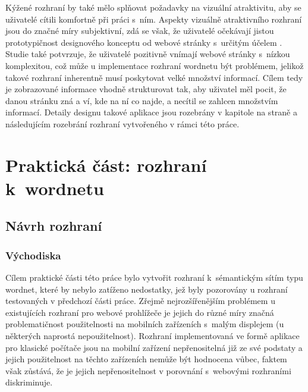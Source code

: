 \documentclass[a4paper, 11pt, oneside, showtrims]{book}
\newcommand{\itNameRef}[1]{\textit{\nameref{#1}}}
\begin{document}
			Kýžené rozhraní by také mělo splňovat požadavky na vizuální atraktivitu, aby se uživatelé cítili komfortně při práci s~ním. Aspekty vizuálně atraktivního rozhraní jsou do značné míry subjektivní, zdá se však, že uživatelé očekávají jistou prototypičnost designového konceptu od webové stránky s~určitým účelem \parencite{walker2013simple, tuch2012role}. Studie \parencite{tuch2012role} také potvrzuje, že uživatelé pozitivně vnímají webové stránky s~nízkou komplexitou, což může u implementace rozhraní wordnetu být problémem, jelikož takové rozhraní inherentně musí poskytovat velké množství informací. Cílem tedy je zobrazované informace vhodně strukturovat tak, aby uživatel měl pocit, že danou stránku zná a ví, kde na ní co najde, a necítil se zahlcen množstvím informací. Detaily designu takové aplikace jsou rozebrány v kapitole \itNameRef{cha:navrh} na straně \pageref{cha:navrh} a následujícím rozebrání rozhraní vytvořeného v rámci této práce.

	\part{Praktická část: rozhraní k~wordnetu}
	\label{part:drei}

		\chapter{Návrh rozhraní}
		\label{cha:navrh}


			\section{Východiska}

				Cílem praktické části této práce bylo vytvořit rozhraní k~sémantickým sítím typu wordnet, které by nebylo zatíženo nedostatky, jež byly pozorovány u rozhraní testovaných v předchozí části práce. Zřejmě nejrozšířenějším problémem u existujících rozhraní pro webové prohlížeče je jejich do různé míry značná problematičnost použitelnosti na mobilních zařízeních s~malým displejem (u některých naprostá nepoužitelnost). Rozhraní implementovaná ve formě aplikace pro klasické počítače jsou na mobilní zařízení nepřenositelná již ze své podstaty a jejich použitelnost na těchto zařízeních nemůže být hodnocena vůbec, faktem však zůstává, že je jejich nepřenositelnost v porovnání s~webovými rozhraními diskriminuje. 
\end{document}
